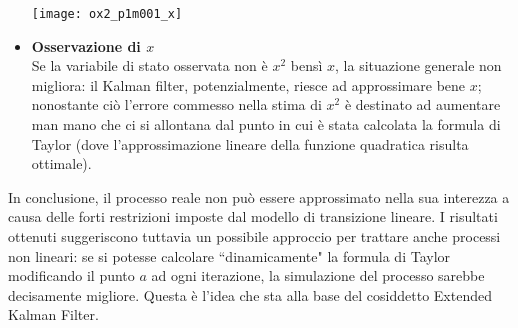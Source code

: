 \begin{itemize}
\begin{minipage}{\linewidth}
	\centering
	\texttt{[image: ox2\_p1m001\_x]}
	\label{ws_a0m100_long}
\end{minipage}

\newpage

\item \textbf{Osservazione di $x$}\\
Se la variabile di stato osservata non è $x^2$ bensì $x$, la situazione generale non migliora: il Kalman filter, potenzialmente, riesce ad approssimare bene $x$; nonostante ciò l'errore commesso nella stima di $x^2$ è destinato ad aumentare man mano che ci si allontana dal punto in cui è stata calcolata la formula di Taylor (dove l'approssimazione lineare della funzione quadratica risulta ottimale). 
\end{itemize}

In conclusione, il processo reale non può essere approssimato nella sua interezza a causa delle forti restrizioni imposte dal modello di transizione lineare. I risultati ottenuti suggeriscono tuttavia un possibile approccio per trattare anche processi non lineari: se si potesse calcolare ``dinamicamente" la formula di Taylor modificando il punto $a$ ad ogni iterazione, la simulazione del processo sarebbe decisamente migliore. Questa è l'idea che sta alla base del cosiddetto Extended Kalman Filter.












